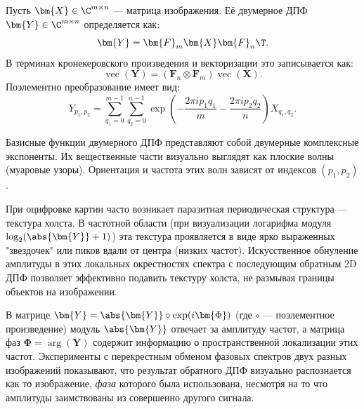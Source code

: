 \begin{tcbdefinition}
\label{def:2d_fourier}
    Пусть $\bm{X} \in \C^{m \times n}$ — матрица изображения. Её двумерное ДПФ $\bm{Y} \in \C^{m \times n}$ определяется как:
    \begin{equation}
        \bm{Y} = \bm{F}_m \bm{X} \bm{F}_n\T.
    \end{equation}
    В терминах кронекеровского произведения и векторизации это записывается как:
    \begin{equation}
        \operatorname{vec}(\bm{Y}) = (\bm{F}_n \otimes \bm{F}_m) \operatorname{vec}(\bm{X}).
    \end{equation}
    Поэлементно преобразование имеет вид:
    \begin{equation}
        Y_{p_1, p_2} = \sum_{q_1=0}^{m-1} \sum_{q_2=0}^{n-1} \exp\left(-\frac{2\pi i p_1 q_1}{m} - \frac{2\pi i p_2 q_2}{n}\right) X_{q_1, q_2}.
    \end{equation}
\end{tcbdefinition}

\begin{tcbremark}
    Базисные функции двумерного ДПФ представляют собой двумерные комплексные экспоненты. Их вещественные части визуально выглядят как плоские волны (муаровые узоры). Ориентация и частота этих волн зависят от индексов $(p_1, p_2)$.
\end{tcbremark}

\begin{tcbexample}
\label{ex:canvas_removal}
    При оцифровке картин часто возникает паразитная периодическая структура — текстура холста. В частотной области (при визуализации логарифма модуля $\log_2(\abs{\bm{Y}} + 1)$) эта текстура проявляется в виде ярко выраженных "звездочек" или пиков вдали от центра (низких частот). Искусственное обнуление амплитуды в этих локальных окрестностях спектра с последующим обратным 2D ДПФ позволяет эффективно подавить текстуру холста, не размывая границы объектов на изображении.
\end{tcbexample}

\begin{tcbinsight}
    В матрице $\bm{Y} = \abs{\bm{Y}} \circ \exp(i\bm{\Phi})$ (где $\circ$ — поэлементное произведение) модуль $\abs{\bm{Y}}$ отвечает за амплитуду частот, а матрица фаз $\bm{\Phi} = \operatorname{arg}(\bm{Y})$ содержит информацию о пространственной локализации этих частот. Эксперименты с перекрестным обменом фазовых спектров двух разных изображений показывают, что результат обратного ДПФ визуально распознается как то изображение, \textit{фаза} которого была использована, несмотря на то что амплитуды заимствованы из совершенно другого сигнала.
\end{tcbinsight}
